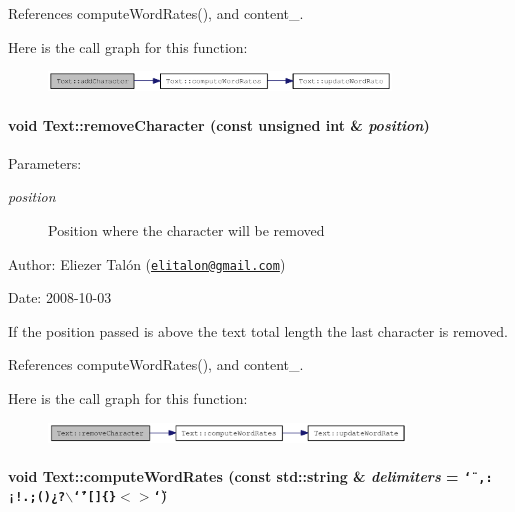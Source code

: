 References computeWordRates(), and content\_\-.

Here is the call graph for this function:\nopagebreak
\begin{figure}[H]
\begin{center}
\leavevmode
\includegraphics[width=258pt]{class_text_fdd11ad0c90ca483d4cff3d74a64da9e_cgraph}
\end{center}
\end{figure}
\hypertarget{class_text_e04500eeada2a4a3bb00554b32263c52}{
\paragraph[removeCharacter]{\setlength{\rightskip}{0pt plus 5cm}void Text::removeCharacter (const unsigned int \& {\em position})}\hfill}
\label{class_text_e04500eeada2a4a3bb00554b32263c52}


\begin{Desc}
\item[Parameters:]
\begin{description}
\item[{\em position}]Position where the character will be removed\end{description}
\end{Desc}
\begin{Desc}
\item[Author:]Eliezer Talón (\href{mailto:elitalon@gmail.com}{\tt elitalon@gmail.com}) \end{Desc}
\begin{Desc}
\item[Date:]2008-10-03\end{Desc}
If the position passed is above the text total length the last character is removed. 

References computeWordRates(), and content\_\-.

Here is the call graph for this function:\nopagebreak
\begin{figure}[H]
\begin{center}
\leavevmode
\includegraphics[width=269pt]{class_text_e04500eeada2a4a3bb00554b32263c52_cgraph}
\end{center}
\end{figure}
\hypertarget{class_text_e954a35628c72537e2ee5ca6e9609ac1}{
\paragraph[computeWordRates]{\setlength{\rightskip}{0pt plus 5cm}void Text::computeWordRates (const std::string \& {\em delimiters} = {\tt \char`\"{}~,:¡!.;()¿?$\backslash$\char`\"{}'\mbox{[}\mbox{]}\{\}$<$$>$\char`\"{}})}\hfill}
\label{class_text_e954a35628c72537e2ee5ca6e9609ac1}


